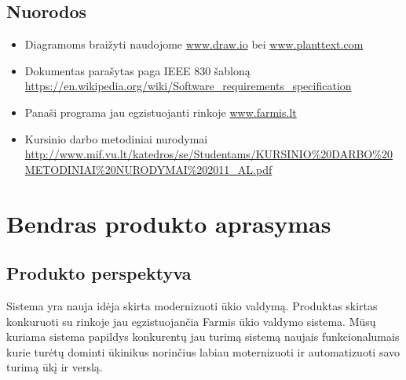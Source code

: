 \documentclass[oneside]{VUMIFPSkursinis}
\begin{document}
\subsection{Nuorodos}
\begin{itemize}
	\item Diagramoms braižyti naudojome \url{www.draw.io} bei \url{www.planttext.com}
	\item Dokumentas parašytas paga IEEE 830 šabloną \url{https://en.wikipedia.org/wiki/Software_requirements_specification}
	\item Panaši programa jau egzistuojanti rinkoje \url{www.farmis.lt}
	\item Kursinio darbo metodiniai nurodymai \url{http://www.mif.vu.lt/katedros/se/Studentams/KURSINIO%20DARBO%20METODINIAI%20NURODYMAI%202011_AL.pdf}
\end{itemize}

\section{Bendras produkto aprasymas}
\subsection{Produkto perspektyva}
Sistema yra nauja idėja skirta modernizuoti ūkio valdymą. Produktas skirtas konkuruoti su rinkoje jau egzistuojančia Farmis ūkio valdymo sistema. Mūsų kuriama sistema papildys konkurentų jau turimą sistemą naujais funkcionalumais kurie turėtų dominti ūkinikus norinčius labiau moternizuoti ir automatizuoti savo turimą ūkį ir verslą. 
\end{document}
